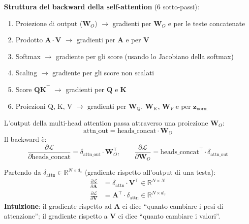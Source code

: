\documentclass[12pt,a4paper]{article}
\begin{document}
\textbf{Struttura del backward della self-attention} (6 sotto-passi):
\begin{enumerate}
    \item Proiezione di output ($\mathbf{W}_O$) $\to$ gradienti per $\mathbf{W}_O$ e per le teste concatenate
    \item Prodotto $\mathbf{A} \cdot \mathbf{V}$ $\to$ gradienti per $\mathbf{A}$ e per $\mathbf{V}$
    \item Softmax $\to$ gradiente per gli score (usando lo Jacobiano della softmax)
    \item Scaling $\to$ gradiente per gli score non scalati
    \item Score $\mathbf{Q}\mathbf{K}^\top$ $\to$ gradienti per $\mathbf{Q}$ e $\mathbf{K}$
    \item Proiezioni Q, K, V $\to$ gradienti per $\mathbf{W}_Q$, $\mathbf{W}_K$, $\mathbf{W}_V$ e per $\mathbf{z}_{\text{norm}}$
\end{enumerate}

\begin{formulabox}
L'output della multi-head attention passa attraverso una proiezione $\mathbf{W}_O$:
\[
    \text{attn\_out} = \text{heads\_concat} \cdot \mathbf{W}_O
\]
Il backward \`e:
\[
    \frac{\partial \mathcal{L}}{\partial \text{heads\_concat}} = \delta_{\text{attn\_out}} \cdot \mathbf{W}_O^\top, \qquad \frac{\partial \mathcal{L}}{\partial \mathbf{W}_O} = \text{heads\_concat}^\top \cdot \delta_{\text{attn\_out}}
\]
\end{formulabox}

\begin{formulabox}[title={B5.2 --- Prodotto $\mathbf{A} \cdot \mathbf{V}$}]
Partendo da $\delta_{\text{attn}} \in \mathbb{R}^{N \times d_v}$ (gradiente rispetto all'output di una testa):
\begin{align*}
    \frac{\partial \mathcal{L}}{\partial \mathbf{A}} &= \delta_{\text{attn}} \cdot \mathbf{V}^\top \in \mathbb{R}^{N \times N} \\[4pt]
    \frac{\partial \mathcal{L}}{\partial \mathbf{V}} &= \mathbf{A}^\top \cdot \delta_{\text{attn}} \in \mathbb{R}^{N \times d_v}
\end{align*}
\textbf{Intuizione}: il gradiente rispetto ad $\mathbf{A}$ ci dice ``quanto cambiare i pesi di attenzione''; il gradiente rispetto a $\mathbf{V}$ ci dice ``quanto cambiare i valori''.
\end{formulabox}
\end{document}
